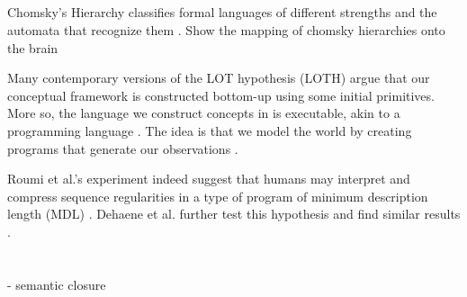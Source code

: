 \subsection{}
Chomsky's Hierarchy classifies formal languages of different strengths and the automata that recognize them \cite{chomsky1959certain}.
Show the mapping of chomsky hierarchies onto the brain


Many contemporary versions of the LOT hypothesis (LOTH) argue that our conceptual framework is constructed bottom-up using some initial primitives. More so, the language we construct concepts in is executable, akin to a programming language \cite{dehaene_symbols_2022}. The idea is that we model the world by creating programs that generate our observations \cite{rule_child_2020}.

Roumi et al.'s experiment indeed suggest that humans may interpret and compress sequence regularities in a type of program of minimum description length (MDL) \cite{al_roumi_mental_2021}.
Dehaene et al. further test this hypothesis and find similar results \cite{dehaene_symbols_2022}.





\section{}
- semantic closure


